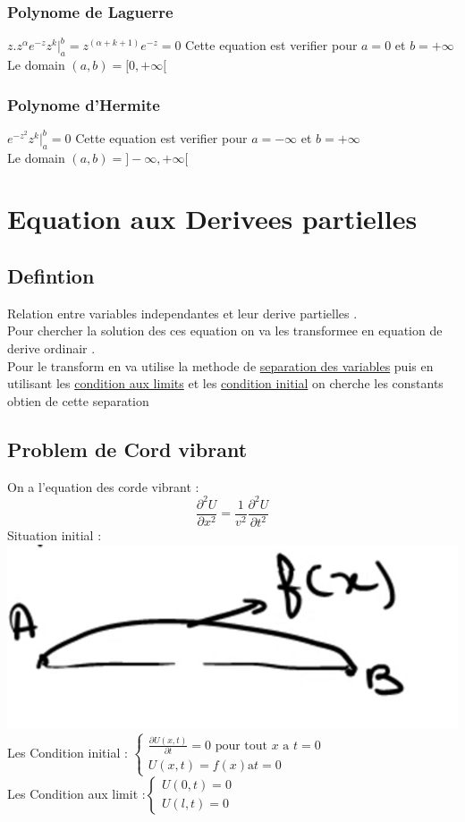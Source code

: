 \documentclass[12pt]{book}
\begin{document}
            \subsection*{Polynome de Laguerre}
                $z.z^\alpha e^{-z}z^k|_a^b =z^(\alpha + k +1)e^{-z}=0$ Cette equation est verifier pour $a=0 $ et $ b=+\infty $ \\
                Le domain $(a,b) = [0,+\infty[$
            \subsection*{Polynome d'Hermite}
                $e^{-z^2}z^k|_a^b =0$ Cette equation est verifier pour $a=-\infty $ et $ b=+\infty $ \\
                Le domain $(a,b) = ]-\infty , +\infty[$
    \chapter{Equation aux Derivees partielles}
        \section{Defintion}
            Relation entre variables independantes et leur derive partielles . \\
            Pour chercher la solution des ces equation on va les transformee en equation de derive ordinair .\\
            Pour le transform en va utilise la methode de \underline{separation des variables} puis en utilisant les \underline{condition aux limits} et les \underline{condition initial} on cherche les constants obtien de cette separation \\
        \section{Problem de Cord vibrant}
            On a l'equation des corde vibrant : 
            \[ \frac{\partial^2U}{\partial x^2} = \frac{1}{v^2}\frac{\partial^2U}{\partial t^2} \]
            Situation initial : \\
            \includegraphics[width=0.5\linewidth]{pic/cordinitial.png} \\
            Les Condition initial : $\begin{cases}\frac{\partial U(x,t)}{\partial t} = 0  \text{ pour tout } x \text{ a } t =0 \\ U(x,t) =f(x)   \text{a} t =0\end{cases}$ \\
            Les Condition aux limit :$ \begin{cases} U(0,t) =0 \\  U(l,t) =0 \end{cases} $\\
\end{document}
